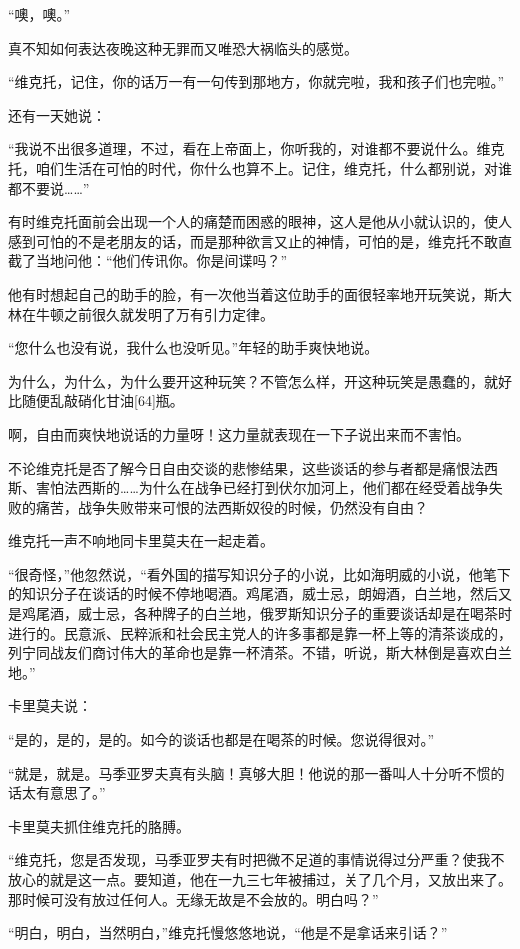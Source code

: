 “噢，噢。”

真不知如何表达夜晚这种无罪而又唯恐大祸临头的感觉。

“维克托，记住，你的话万一有一句传到那地方，你就完啦，我和孩子们也完啦。”

还有一天她说：

“我说不出很多道理，不过，看在上帝面上，你听我的，对谁都不要说什么。维克托，咱们生活在可怕的时代，你什么也算不上。记住，维克托，什么都别说，对谁都不要说……”

有时维克托面前会出现一个人的痛楚而困惑的眼神，这人是他从小就认识的，使人感到可怕的不是老朋友的话，而是那种欲言又止的神情，可怕的是，维克托不敢直截了当地问他：“他们传讯你。你是间谍吗？”

他有时想起自己的助手的脸，有一次他当着这位助手的面很轻率地开玩笑说，斯大林在牛顿之前很久就发明了万有引力定律。

“您什么也没有说，我什么也没听见。”年轻的助手爽快地说。

为什么，为什么，为什么要开这种玩笑？不管怎么样，开这种玩笑是愚蠢的，就好比随便乱敲硝化甘油[64]瓶。

啊，自由而爽快地说话的力量呀！这力量就表现在一下子说出来而不害怕。

不论维克托是否了解今日自由交谈的悲惨结果，这些谈话的参与者都是痛恨法西斯、害怕法西斯的……为什么在战争已经打到伏尔加河上，他们都在经受着战争失败的痛苦，战争失败带来可恨的法西斯奴役的时候，仍然没有自由？

维克托一声不响地同卡里莫夫在一起走着。

“很奇怪，”他忽然说，“看外国的描写知识分子的小说，比如海明威的小说，他笔下的知识分子在谈话的时候不停地喝酒。鸡尾酒，威士忌，朗姆酒，白兰地，然后又是鸡尾酒，威士忌，各种牌子的白兰地，俄罗斯知识分子的重要谈话却是在喝茶时进行的。民意派、民粹派和社会民主党人的许多事都是靠一杯上等的清茶谈成的，列宁同战友们商讨伟大的革命也是靠一杯清茶。不错，听说，斯大林倒是喜欢白兰地。”

卡里莫夫说：

“是的，是的，是的。如今的谈话也都是在喝茶的时候。您说得很对。”

“就是，就是。马季亚罗夫真有头脑！真够大胆！他说的那一番叫人十分听不惯的话太有意思了。”

卡里莫夫抓住维克托的胳膊。

“维克托，您是否发现，马季亚罗夫有时把微不足道的事情说得过分严重？使我不放心的就是这一点。要知道，他在一九三七年被捕过，关了几个月，又放出来了。那时候可没有放过任何人。无缘无故是不会放的。明白吗？”

“明白，明白，当然明白，”维克托慢悠悠地说，“他是不是拿话来引话？”

